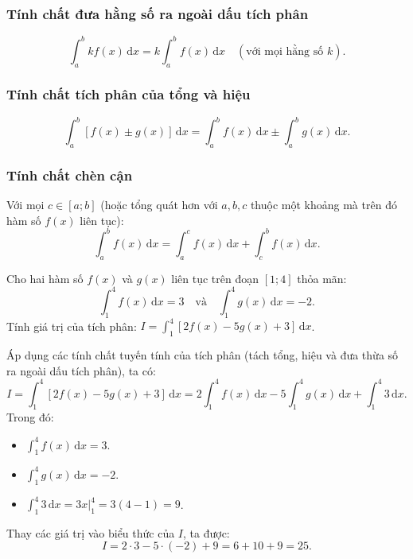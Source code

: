 \documentclass[12pt]{article}
\begin{document}
	\subsubsection{Tính chất đưa hằng số ra ngoài dấu tích phân}
	\[
	\int_a^b k f(x)\,\mathrm{d}x = k \int_a^b f(x)\,\mathrm{d}x \quad (\text{với mọi hằng số } k).
	\]
	
	\subsubsection{Tính chất tích phân của tổng và hiệu}
	\[
	\int_a^b [f(x) \pm g(x)]\,\mathrm{d}x = \int_a^b f(x)\,\mathrm{d}x \pm \int_a^b g(x)\,\mathrm{d}x.
	\]
	
	\subsubsection{Tính chất chèn cận}
	Với mọi $c \in [a; b]$ (hoặc tổng quát hơn với $a, b, c$ thuộc một khoảng mà trên đó hàm số $f(x)$ liên tục):
	\[
	\int_a^b f(x)\,\mathrm{d}x = \int_a^c f(x)\,\mathrm{d}x + \int_c^b f(x)\,\mathrm{d}x.
	\]
	
	\begin{vidu}
		Cho hai hàm số $f(x)$ và $g(x)$ liên tục trên đoạn $[1; 4]$ thỏa mãn:
		\[
		\int_1^4 f(x)\,\mathrm{d}x = 3 \quad \text{và} \quad \int_1^4 g(x)\,\mathrm{d}x = -2.
		\]
		Tính giá trị của tích phân: $I = \displaystyle \int_1^4 [2f(x) - 5g(x) + 3]\,\mathrm{d}x$.
	\end{vidu}
	\begin{loigiai}
		Áp dụng các tính chất tuyến tính của tích phân (tách tổng, hiệu và đưa thừa số ra ngoài dấu tích phân), ta có:
		\[
		I = \int_1^4 [2f(x) - 5g(x) + 3]\,\mathrm{d}x = 2 \int_1^4 f(x)\,\mathrm{d}x - 5 \int_1^4 g(x)\,\mathrm{d}x + \int_1^4 3\,\mathrm{d}x.
		\]
		Trong đó:
		\begin{itemize}
			\item $\displaystyle \int_1^4 f(x)\,\mathrm{d}x = 3$.
			\item $\displaystyle \int_1^4 g(x)\,\mathrm{d}x = -2$.
			\item $\displaystyle \int_1^4 3\,\mathrm{d}x = \left. 3x \right|_1^4 = 3(4 - 1) = 9$.
		\end{itemize}
		Thay các giá trị vào biểu thức của $I$, ta được:
		\[
		I = 2 \cdot 3 - 5 \cdot (-2) + 9 = 6 + 10 + 9 = 25.
		\]
	\end{loigiai}
	
\end{document}

